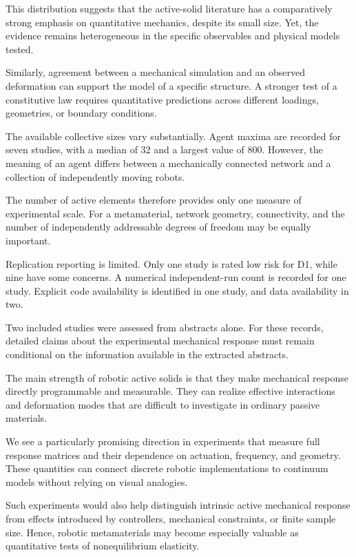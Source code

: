 This distribution suggests
that the active-solid
literature has a comparatively
strong emphasis on
quantitative mechanics,
despite its small size.
Yet, the evidence remains
heterogeneous in the
specific observables
and physical models tested.

Similarly, agreement between
a mechanical simulation
and an observed deformation
can support the model
of a specific structure.
A stronger test of
a constitutive law
requires quantitative
predictions across
different loadings,
geometries, or
boundary conditions.

The available collective
sizes vary substantially.
Agent maxima are recorded
for seven studies, with
a median of 32 and
a largest value of 800.
However, the meaning
of an agent differs
between a mechanically
connected network and
a collection of
independently moving
robots.

The number of active
elements therefore
provides only one
measure of experimental
scale. For a metamaterial,
network geometry,
connectivity, and
the number of
independently addressable
degrees of freedom
may be equally important.

Replication reporting is
limited. Only one study
is rated low risk for D1,
while nine have some
concerns. A numerical
independent-run count
is recorded for one
study. Explicit code
availability is identified
in one study, and data
availability in two.

Two included studies
were assessed from
abstracts alone.
For these records,
detailed claims about
the experimental
mechanical response
must remain conditional
on the information
available in the
extracted abstracts.

The main strength of
robotic active solids
is that they make
mechanical response
directly programmable
and measurable.
They can realize
effective interactions
and deformation modes
that are difficult
to investigate in
ordinary passive
materials.

We see a particularly
promising direction
in experiments that
measure full response
matrices and their
dependence on actuation,
frequency, and geometry.
These quantities can
connect discrete
robotic implementations
to continuum models
without relying on
visual analogies.

Such experiments would
also help distinguish
intrinsic active
mechanical response
from effects introduced
by controllers,
mechanical constraints,
or finite sample size.
Hence, robotic
metamaterials may
become especially
valuable as
quantitative tests
of nonequilibrium
elasticity.

